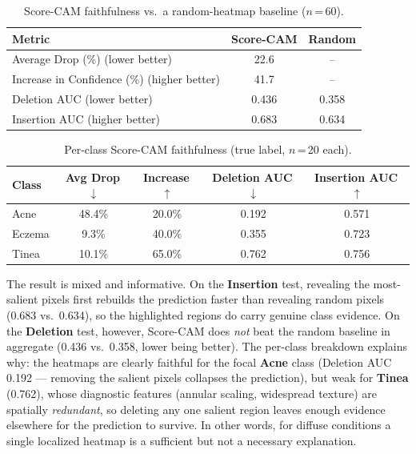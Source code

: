 \begin{table}[H]
\centering
\caption{Score-CAM faithfulness vs.\ a random-heatmap baseline ($n$\,=\,60).}
\label{tab:xai}
\begin{tabular}{|l|c|c|}
\hline
\textbf{Metric} & \textbf{Score-CAM} & \textbf{Random} \\ \hline
Average Drop (\%) \;(lower better)            & 22.6  & -- \\ \hline
Increase in Confidence (\%) \;(higher better) & 41.7  & -- \\ \hline
Deletion AUC \;(lower better)                 & 0.436 & 0.358 \\ \hline
Insertion AUC \;(higher better)               & 0.683 & 0.634 \\ \hline
\end{tabular}
\end{table}

\begin{table}[H]
\centering
\caption{Per-class Score-CAM faithfulness (true label, $n$\,=\,20 each).}
\label{tab:xai_class}
\begin{tabular}{|l|c|c|c|c|}
\hline
\textbf{Class} & \textbf{Avg Drop\,$\downarrow$} & \textbf{Increase\,$\uparrow$} & \textbf{Deletion AUC\,$\downarrow$} & \textbf{Insertion AUC\,$\uparrow$} \\ \hline
Acne   & 48.4\% & 20.0\% & 0.192 & 0.571 \\ \hline
Eczema &  9.3\% & 40.0\% & 0.355 & 0.723 \\ \hline
Tinea  & 10.1\% & 65.0\% & 0.762 & 0.756 \\ \hline
\end{tabular}
\end{table}

\noindent The result is mixed and informative. On the \textbf{Insertion} test,
revealing the most-salient pixels first rebuilds the prediction faster than
revealing random pixels (0.683 vs.\ 0.634), so the highlighted regions do carry
genuine class evidence. On the \textbf{Deletion} test, however, Score-CAM does
\emph{not} beat the random baseline in aggregate (0.436 vs.\ 0.358, lower being
better). The per-class breakdown explains why: the heatmaps are clearly faithful
for the focal \textbf{Acne} class (Deletion AUC 0.192 — removing the salient
pixels collapses the prediction), but weak for \textbf{Tinea} (0.762), whose
diagnostic features (annular scaling, widespread texture) are spatially
\emph{redundant}, so deleting any one salient region leaves enough evidence
elsewhere for the prediction to survive. In other words, for diffuse conditions a
single localized heatmap is a sufficient but not a necessary explanation.

